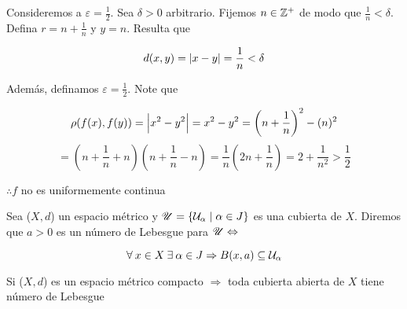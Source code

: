 \begin{proofexplanation}
    Consideremos a $\varepsilon = \frac{1}{2}$. Sea $\delta > 0$ arbitrario. Fijemos $n \in \mathbb{Z}^+$ de modo que $\frac{1}{n} < \delta$. Defina $r = n + \frac{1}{n}$ y $y = n$. Resulta que 

    $$d(x,y) = \abs{x-y} = \frac{1}{n} < \delta$$

    Además, definamos $\varepsilon = \frac{1}{2}$. Note que

    $$\rho(f(x),f(y)) = \abs{x^2-y^2} = x^2-y^2 = \left( n + \frac{1}{n} \right)^2 - (n)^2$$
    $$= \left( n + \frac{1}{n} +n \right)\left( n + \frac{1}{n} - n \right) = \frac{1}{n} \left( 2n + \frac{1}{n} \right) = 2 + \frac{1}{n^2} > \frac{1}{2}$$

    $\therefore f$ no es uniformemente continua
\end{proofexplanation}

\begin{definition}
    Sea ($X,d$) un espacio métrico y $\mathscr{U} = \{ \mathcal{U}_\alpha \mid \alpha \in J \}$ es una cubierta de $X$. Diremos que $a > 0$ es un número de Lebesgue para $\mathscr{U} \Leftrightarrow$

    $$\forall \: x \in X \: \exists \: \alpha\in J \Rightarrow B(x,a) \subseteq \mathcal{U}_\alpha$$
\end{definition}

\begin{lemma} \label{lemacubleb}
    Si ($X,d$) es un espacio métrico compacto $\Rightarrow$ toda cubierta abierta de $X$ tiene número de Lebesgue
\end{lemma}

